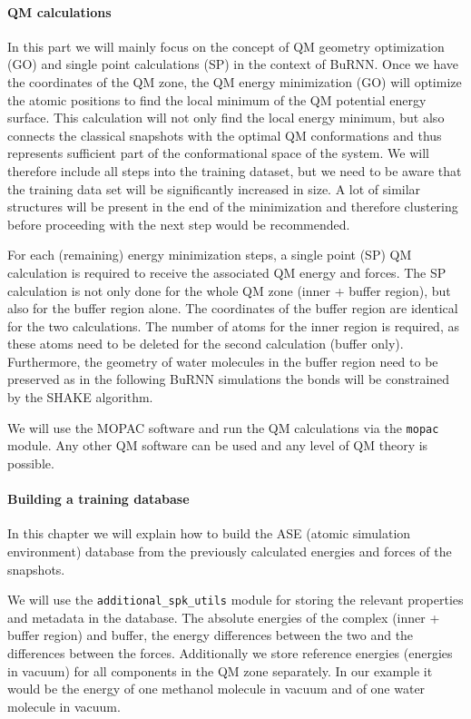 \paragraph{QM calculations}
In this part we will mainly focus on the concept of QM geometry optimization (GO) and single point calculations (SP) in the context of BuRNN.
Once we have the coordinates of the QM zone, the QM energy minimization (GO) will optimize the atomic positions to find the local minimum of the QM potential energy surface. This calculation will not only find the local energy minimum, but also connects the classical snapshots with the optimal QM conformations and thus represents sufficient part of the conformational space of the system. We will therefore include all steps into the training dataset, but we need to be aware that the training data set will be significantly increased in size. A lot of similar structures will be present in the end of the minimization and therefore clustering before proceeding with the next step would be recommended.

For each (remaining) energy minimization steps, a single point (SP) QM calculation is required to receive the associated QM energy and forces. The SP calculation is not only done for the whole QM zone (inner + buffer region), but also for the buffer region alone. The coordinates of the buffer region are identical for the two calculations. The number of atoms for the inner region is required, as these atoms need to be deleted for the second calculation (buffer only). Furthermore, the geometry of water molecules in the buffer region need to be preserved as in the following BuRNN simulations the bonds will be constrained by the SHAKE algorithm\cite{RYCKAERT1977SHAKE}.

We will use the MOPAC software and run the QM calculations via the \texttt{mopac} module. Any other QM software can be used and any level of QM theory is possible.

\paragraph{Building a training database}
In this chapter we will explain how to build the ASE (atomic simulation environment) \cite{Larsen2017ASE} database from the previously calculated energies and forces of the snapshots. 

We will use the \texttt{additional\_spk\_utils} module for storing the relevant properties and metadata in the database. The absolute energies of the complex (inner + buffer region) and buffer, the energy differences between the two and the differences between the forces. Additionally we store reference energies (energies in vacuum) for all components in the QM zone separately. In our example it would be the energy of one methanol molecule in vacuum and of one water molecule in vacuum. 

